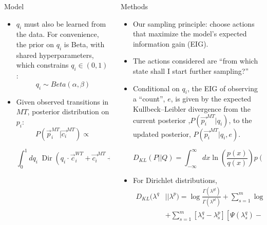 \documentclass[final]{beamer}
\begin{document}
\begin{frame}{}
\begin{columns}[t]
\begin{column}{.3\linewidth}
\begin{block}{Model}
\begin{itemize}
    \item $q_i$ must also be learned from the data. For convenience, the prior on $q_i$ is Beta, with shared hyperparameters, which constrains $q_i \in (0,1)$:
    $$ q_i \sim Beta(\alpha, \beta) $$
    \item Given observed transitions in $MT$, posterior distribution on $p_i$:
    $$
    P(\vec{p}_i^{MT} \vert \vec{c_i}^{MT}) \propto %
    $$
    
    $$
    \int_0^1 dq_i \; \operatorname{Dir}(q_i \cdot \vec{c}_i^{WT} + \vec{c_i}^{MT} + 1/2) \cdot  P_{\alpha, \beta}(q_i)
    $$
    
\end{itemize}
\end{block}
\end{column}

\begin{column}{.3\linewidth}

\begin{block}{Methods}
\begin{itemize}
\item Our sampling principle: choose actions that maximize the model's \alert{expected information gain (EIG)}.

\item The actions considered are ``from which state shall I start further sampling?''

\item Conditional on $q_i$, the EIG of observing a ``count'', $e$, is given by the expected Kullbeck--Leibler divergence from the current posterior ,$P(\vec{p_i}^{MT} | q_i)$, to the updated posterior, $P(\vec{p_i}^{MT} | q_i, e)$.

$$
D_{KL}(P||Q) = \int_{-\infty}^{\infty} dx \ln\left( \frac{p(x)}{q(x)} \right) p(x)
$$

\item For Dirichlet distributions,
\begin{align*}
D_{KL}(\lambda^q &|| \lambda^p) = \log \frac{\Gamma(\lambda^{qt})}{\Gamma(\lambda^{pt})} + \sum_{s=1}^m \log \frac{\Gamma(\lambda^p_s)}{\Gamma(\lambda^q_s)} \\
&+ \sum_{s=1}^m \left[\lambda^q_s -\lambda^p_s\right]\left[\Psi(\lambda^q_s) - \Psi(\lambda^{qt})\right]
\end{align*}



\end{itemize}
\end{block}
\end{column}
\end{columns}
\end{frame}
\end{document}
